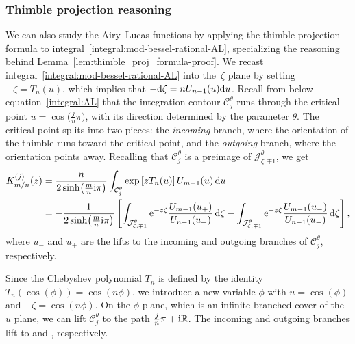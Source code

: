 \documentclass[10pt,a4paper]{amsart}
\newcommand{\R}{\mathbb{R}}
\numberwithin{equation}{section}
\begin{document}
\subsubsection{Thimble projection reasoning}\label{contour-argument-AL}
We can also study the Airy--Lucas functions by applying the thimble projection formula to integral~\eqref{integral:mod-bessel-rational-AL}, specializing the reasoning behind Lemma~\ref{lem:thimble_proj_formula-proof}. We recast integral~\eqref{integral:mod-bessel-rational-AL} into the~$\zeta$ plane by setting $-\zeta = T_n(u)$, which implies that $-{\rm d}\zeta = n U_{n-1}(u) {\rm d}u$. Recall from below equation~\eqref{integral:AL} that the integration contour $\mathcal{C}^\theta_j$ runs through the critical point $u = \cos\bigl(\frac{j}{n}\pi\bigr)$, with its direction determined by the parameter $\theta$. The critical point splits  into two pieces: the {\em incoming} branch, where the orientation of the thimble runs toward the critical point, and the {\em outgoing} branch, where the orientation points away. Recalling that $\mathcal{C}^\theta_j$ is a preimage of $\mathcal{J}^\theta_{\zeta, \mp 1}$, we get
\begin{align*}
K^{(j)}_{m/n}(z) & = \frac{n}{2 \sinh\bigl(\frac{m}{n} {\rm i}\pi\bigr)} \int_{\mathcal{C}^\theta_j} \exp\left[z T_n(u)\right] U_{m-1}(u) \,{\rm d}u \\
& = -\frac{1}{2\sinh\bigl(\frac{m}{n} {\rm i}\pi\bigr)} \left[ \int_{\mathcal{J}^\theta_{\zeta, \mp 1}} {\rm e}^{-z\zeta} \frac{U_{m-1}(u_+)}{U_{n-1}(u_+)} \,{\rm d}\zeta - \int_{\mathcal{J}^\theta_{\zeta, \mp 1}} {\rm e}^{-z\zeta} \frac{U_{m-1}(u_-)}{U_{n-1}(u_-)} \,{\rm d}\zeta \right],
\end{align*}
where $u_-$ and $u_+$ are the lifts to the incoming and outgoing branches of $\mathcal{C}^\theta_j$, respectively.

Since the Chebyshev polynomial $T_n$ is defined by the identity $T_n(\cos(\phi)) = \cos(n\phi)$, we introduce a new variable $\phi$ with $u = \cos(\phi)$ and $-\zeta = \cos(n\phi)$. On the $\phi$ plane, which is an infinite branched cover of the $u$ plane, we can lift $\mathcal{C}^\theta_j$ to the path $\frac{j}{n}\pi + {\rm i}\R$. The incoming and outgoing branches lift to \smash{$\frac{j}{n}\pi - {\rm i}[0, \infty)$} and \smash{$\frac{j}{n}\pi + {\rm i}[0, \infty)$}, respectively.
\end{document}
